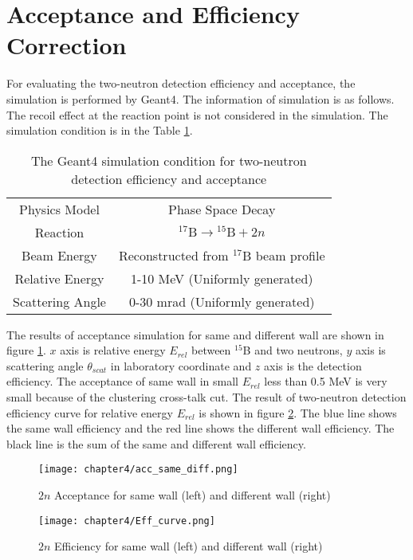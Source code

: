 \section{Acceptance and Efficiency Correction}
For evaluating the two-neutron detection efficiency and acceptance, the simulation is performed by Geant4. The information of simulation is as follows. The recoil effect at the reaction point is not considered in the simulation. The simulation condition is in the Table \ref{tab:2n_sim}.
\begin{table}[h]
    \centering
    \begin{tabular}[h]{c|c}
        \hline
        Physics Model & Phase Space Decay \\
        Reaction & ${}^{17}\text{B} \to {}^{15}\text{B} + 2n$\\
        Beam Energy & Reconstructed from $^{17}$B beam profile\\
        Relative Energy & 1-10 MeV (Uniformly generated)\\
        Scattering Angle & 0-30 mrad (Uniformly generated)\\
        \hline
    \end{tabular}
    \caption{The Geant4 simulation condition for two-neutron detection efficiency and acceptance}
    \label{tab:2n_sim}
\end{table}

The results of acceptance simulation for same and different wall are shown in figure \ref{fig:acc_same_diff}. $x$ axis is relative energy $E_{rel}$ between $^{15}$B and two neutrons, $y$ axis is scattering angle $\theta_{scat}$ in laboratory coordinate and $z$ axis is the detection efficiency. The acceptance of same wall in small $E_{rel}$ less than 0.5 MeV is very small because of the clustering cross-talk cut. The result of two-neutron detection efficiency curve for relative energy $E_{rel}$ is shown in figure \ref{fig:eff}. The blue line shows the same wall efficiency and the red line shows the different wall efficiency. The black line is the sum of the same and different wall efficiency. 
\begin{figure}[h]
    \centering
    \texttt{[image: chapter4/acc\_same\_diff.png]}
    \caption[$2n$ Acceptance for $E_{rel}$ and $\theta_{scat}$]{$2n$ Acceptance for same wall (left) and different wall (right)}
    \label{fig:acc_same_diff}
\end{figure}

\begin{figure}
    \centering
    \texttt{[image: chapter4/Eff\_curve.png]}
    \caption[$2n$ detection efficiency for same wall and diff wall]{$2n$ Efficiency for same wall (left) and different wall (right)}
    \label{fig:eff}
\end{figure}


